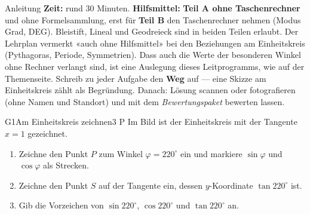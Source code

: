 \documentclass[11pt]{article}
\begin{document}

\begin{lpinfo}{Anleitung}
\textbf{Zeit:} rund 30 Minuten. \textbf{Hilfsmittel:} \textbf{Teil A ohne Taschenrechner} und ohne Formelsammlung, erst für \textbf{Teil B} den Taschenrechner nehmen (Modus Grad, DEG). Bleistift, Lineal und Geodreieck sind in beiden Teilen erlaubt.
Der Lehrplan vermerkt «auch ohne Hilfsmittel» bei den Beziehungen am Einheitskreis (Pythagoras, Periode, Symmetrien). Dass auch die Werte der besonderen Winkel ohne Rechner verlangt sind, ist eine Auslegung dieses Leitprogramms, wie auf der Themenseite.
Schreib zu jeder Aufgabe den \textbf{Weg} auf — eine Skizze am Einheitskreis zählt als Begründung.
Danach: Lösung scannen oder fotografieren (ohne Namen und Standort) und mit dem \emph{Bewertungspaket} bewerten lassen.
\end{lpinfo}


\begin{lpaufgabe}{G1}{Am Einheitskreis zeichnen}{3 P}
Im Bild ist der Einheitskreis mit der Tangente $x = 1$ gezeichnet.
\begin{enumerate}[label=(\alph*),leftmargin=*,itemsep=1pt]
\item Zeichne den Punkt $P$ zum Winkel $\varphi = 220^\circ$ ein und markiere $\sin\varphi$ und $\cos\varphi$ als Strecken.
\item Zeichne den Punkt $S$ auf der Tangente ein, dessen $y$-Koordinate $\tan 220^\circ$ ist.
\item Gib die Vorzeichen von $\sin 220^\circ$, $\cos 220^\circ$ und $\tan 220^\circ$ an.
\end{enumerate}
\par\smallskip\centering
{}
\par\raggedright
{}
\end{lpaufgabe}
\end{document}
